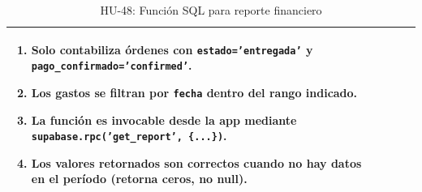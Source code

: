 \begin{table}[H]
\begin{tabularx}{\textwidth}{|>{\bfseries}p{3.5cm}|X|>{\bfseries}p{3.5cm}|X|}
{\begin{enumerate}[leftmargin=1.5em, itemsep=0pt, parsep=2pt, topsep=0pt]
    \item Solo contabiliza órdenes con \texttt{estado='entregada'} y \texttt{pago\_confirmado='confirmed'}.
    \item Los gastos se filtran por \texttt{fecha} dentro del rango indicado.
    \item La función es invocable desde la app mediante \texttt{supabase.rpc('get\_report', \{...\})}.
    \item Los valores retornados son correctos cuando no hay datos en el período (retorna ceros, no null).
  \end{enumerate}
} \\
\hline
\end{tabularx}
\caption{HU-48: Función SQL para reporte financiero}
\end{table}


